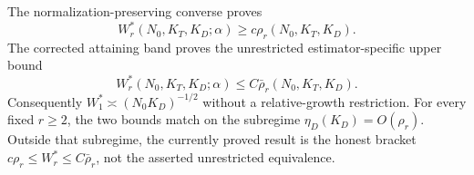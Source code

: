 The normalization-preserving converse proves
\[
 W_r^*(N_0,K_T,K_D;\alpha)\ge c\rho_r(N_0,K_T,K_D).
\]
The corrected attaining band proves the unrestricted estimator-specific upper bound
\[
 W_r^*(N_0,K_T,K_D;\alpha)\le C\bar\rho_r(N_0,K_T,K_D).
\]
Consequently \(W_1^*\asymp(N_0K_D)^{-1/2}\) without a relative-growth restriction.  For every fixed \(r\ge2\), the two bounds match on the subregime \(\eta_D(K_D)=O(\rho_r)\).  Outside that subregime, the currently proved result is the honest bracket \(c\rho_r\le W_r^*\le C\bar\rho_r\), not the asserted unrestricted equivalence.